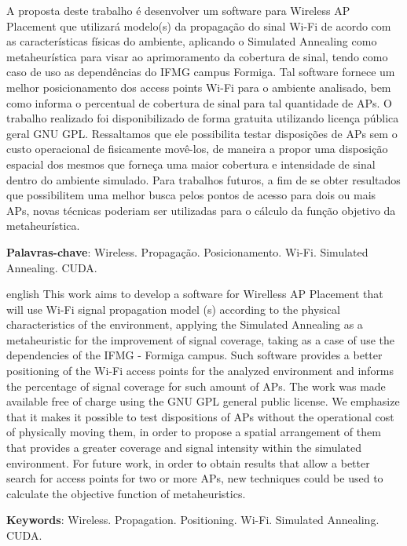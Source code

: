 \documentclass[
	12pt,				%
	twoside,			%
	a4paper,			%
	english,			%
	french,				%
	spanish,			%
	brazil				%
	]{abntex2}
\begin{document}
\setlength{\absparsep}{18pt} %
\begin{resumo}

  A proposta deste trabalho é desenvolver um software para Wireless AP
  Placement que utilizará modelo(s) da propagação do sinal Wi-Fi de acordo
  com as características físicas do ambiente, aplicando o Simulated
  Annealing como metaheurística para visar ao aprimoramento da cobertura
  de sinal, tendo como caso de uso as dependências do IFMG campus Formiga.
  Tal software fornece um melhor posicionamento dos access points Wi-Fi
  para o ambiente analisado, bem como informa o percentual de cobertura de
  sinal para tal quantidade de APs. O trabalho realizado foi
  disponibilizado de forma gratuita utilizando licença pública geral GNU
  GPL. Ressaltamos que ele possibilita testar disposições de APs sem o
  custo operacional de fisicamente movê-los, de maneira a propor uma
  disposição espacial dos mesmos que forneça uma maior cobertura e
  intensidade de sinal dentro do ambiente simulado. Para trabalhos
  futuros, a fim de se obter resultados que possibilitem uma melhor busca
  pelos pontos de acesso para dois ou mais APs, novas técnicas poderiam
  ser utilizadas para o cálculo da função objetivo da metaheurística.

 \textbf{Palavras-chave}: Wireless. Propagação. Posicionamento. Wi-Fi. Simulated Annealing. CUDA.
\end{resumo}



\begin{resumo}[Abstract]
 \begin{otherlanguage*}{english}
   This work aims to develop a software for Wirelless AP Placement that
   will use Wi-Fi signal propagation model (s) according to the physical
   characteristics of the environment, applying the Simulated Annealing as
   a metaheuristic for the improvement of signal coverage, taking as a case
   of use the dependencies of the IFMG - Formiga campus. Such software
   provides a better positioning of the Wi-Fi access points for the
   analyzed environment and informs the percentage of signal coverage for
   such amount of APs. The work was made available free of charge using the
   GNU GPL general public license. We emphasize that it makes it possible
   to test dispositions of APs without the operational cost of physically
   moving them, in order to propose a spatial arrangement of them that
   provides a greater coverage and signal intensity within the simulated
   environment. For future work, in order to obtain results that allow a
   better search for access points for two or more APs, new techniques
   could be used to calculate the objective function of metaheuristics.

   \vspace{\onelineskip}
 
   \noindent 
   \textbf{Keywords}: Wireless. Propagation. Positioning. Wi-Fi. Simulated Annealing. CUDA.
 \end{otherlanguage*}
\end{resumo}
\end{document}
